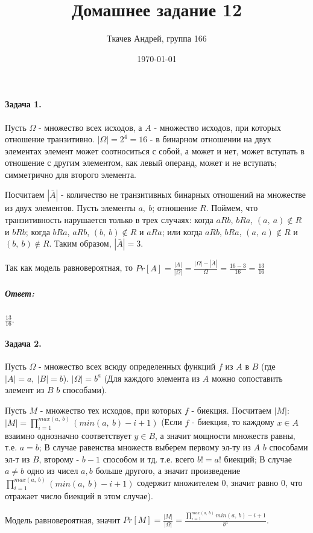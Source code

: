 \documentclass{article}
\title{Домашнее задание 12}
\author{Ткачев Андрей, группа 166}
\date{\today}
\newcommand{\pair}[2]{(#1,\ #2)}
\begin{document}
	\maketitle
	\paragraph{Задача 1.} Пусть $\Omega$ - множество всех исходов, а $A$ - множество исходов, при которых отношение транзитивно. $|\Omega| = 2^4 = 16$ - в бинарном отношении на двух элементах элемент может соотноситься с собой, а может и нет, может вступать в отношение с другим элементом, как левый операнд, может и не вступать; симметрично для второго элемента. 
	
	Посчитаем $|\bar{A}|$ - количество не транзитивных бинарных отношений на множестве из двух элементов. Пусть элементы $a,\ b$; отношение $R$. Поймем, что транзитивность нарушается только в трех случаях: когда $aRb$, $bRa$, $\pair{a}{a} \notin R$ и $bRb$; когда $bRa$, $aRb$, $\pair{b}{b} \notin R$ и $aRa$;
	или когда $aRb$, $bRa$, $\pair{a}{a} \notin R$ и $\pair{b}{b} \notin R$. Таким образом,  $|\bar{A}| = 3$.

	Так как модель равновероятная, то $Pr[A] = \frac{|A|}{|\Omega|} = \frac{|\Omega| - |\bar{A}|}{\Omega} = \frac{16 - 3}{16} = \frac{13}{16}$
	
	\subparagraph{Ответ:} $\frac{13}{16}$.
	
 	\paragraph{Задача 2.} Пусть $\Omega$ - множество всех всюду определенных функций $f$ из $A$ в $B$ (где $|A| = a,\ |B| = b$). $|\Omega| = b^a$ (Для каждого элемента из $A$ можно сопоставить элемент из $B$ $b$ способами). 
 	
 	Пусть $M$ - множество тех исходов, при которых $f$ - биекция. Посчитаем $|M|$: $|M| = \prod_{i=1}^{max(a,\ b)} (min(a,\ b) - i + 1)$ (Если $f$ - биекция, то каждому $x \in A$ взаимно однозначно соответствует $y \in B$, а значит мощности множеств равны, т.е. $a = b$; В случае равенства множеств выберем первому эл-ту из $A$ $b$ способами эл-т из $B$, второму - $b - 1$ способом и тд. т.е. всего $b!=a!$ биекций; В случае $a \ne b$ одно из чисел $a, b$ больше другого, а значит произведение $\prod_{i=1}^{max(a,\ b)} (min(a,\ b) - i + 1)$ содержит множителем 0, значит равно 0, что отражает число биекций в этом случае).
 	
 	Модель равновероятная, значит $Pr[M] = \frac{|M|}{|\Omega|} = \frac{\prod_{i=1}^{max(a,\ b)} min(a,\ b) - i + 1}{b^a}$.
 	
\end{document}
